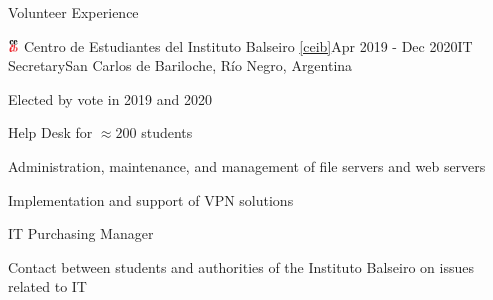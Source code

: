 \documentclass{resume} %
\begin{document}
\begin{rSection}{Volunteer Experience}
    \begin{rSubsection}{\includegraphics[height=0.3cm]{images/ceib.png} Centro de Estudiantes del Instituto Balseiro \ref{ceib}}{Apr 2019 - Dec 2020}{IT Secretary}{San Carlos de Bariloche, Río Negro, Argentina}

        \item Elected by vote in 2019 and 2020
        \item Help Desk for $\approx 200$ students
        \item Administration, maintenance, and management of file servers and web servers
        \item Implementation and support of VPN solutions
        \item IT Purchasing Manager
        \item Contact between students and authorities of the Instituto Balseiro on issues related to IT

    \end{rSubsection}


\end{rSection}

\end{document}
